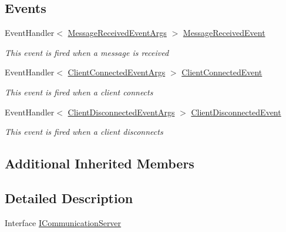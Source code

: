 \subsection*{Events}
\begin{DoxyCompactItemize}
\item 
Event\+Handler$<$ \hyperlink{class_client_server_using_named_pipes_1_1_interfaces_1_1_message_received_event_args}{Message\+Received\+Event\+Args} $>$ \hyperlink{interface_client_server_using_named_pipes_1_1_interfaces_1_1_i_communication_server_a8acf3ca7ac738a4d693beb7efc7fd226}{Message\+Received\+Event}
\begin{DoxyCompactList}\small\item\em This event is fired when a message is received \end{DoxyCompactList}\item 
Event\+Handler$<$ \hyperlink{class_client_server_using_named_pipes_1_1_interfaces_1_1_client_connected_event_args}{Client\+Connected\+Event\+Args} $>$ \hyperlink{interface_client_server_using_named_pipes_1_1_interfaces_1_1_i_communication_server_a4ef1765c48939aec3e6826dc58d9f842}{Client\+Connected\+Event}
\begin{DoxyCompactList}\small\item\em This event is fired when a client connects \end{DoxyCompactList}\item 
Event\+Handler$<$ \hyperlink{class_client_server_using_named_pipes_1_1_interfaces_1_1_client_disconnected_event_args}{Client\+Disconnected\+Event\+Args} $>$ \hyperlink{interface_client_server_using_named_pipes_1_1_interfaces_1_1_i_communication_server_a8efc0f953077379259a43821c7f195ae}{Client\+Disconnected\+Event}
\begin{DoxyCompactList}\small\item\em This event is fired when a client disconnects \end{DoxyCompactList}\end{DoxyCompactItemize}
\subsection*{Additional Inherited Members}


\subsection{Detailed Description}
Interface \hyperlink{interface_client_server_using_named_pipes_1_1_interfaces_1_1_i_communication_server}{I\+Communication\+Server} 

